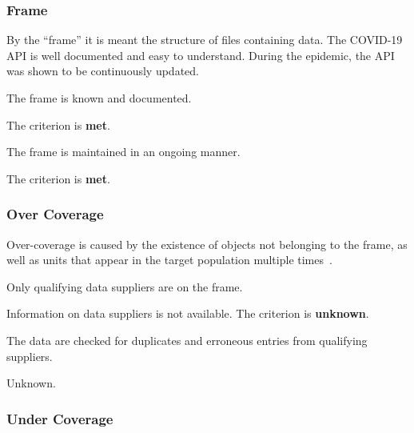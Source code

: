 \subsubsection{Frame}

By the \enquote{frame} it is meant the structure of files containing data.
The COVID-19 API is well documented and easy to understand.
During the epidemic, the API was shown to be continuously updated.

\begin{QandA}
    \item The frame is known and documented.
    \begin{answered}
        The criterion is \textbf{met}.
    \end{answered}

    \item The frame is maintained in an ongoing manner.
    \begin{answered}
        The criterion is \textbf{met}.
    \end{answered}

\end{QandA}

\subsubsection{Over Coverage}

Over-coverage is caused by the existence of objects not belonging to the frame, as well as units that appear in the target population multiple times~\cite{over-coverage}.

\begin{QandA}
    \item Only qualifying data suppliers are on the frame.
    \begin{answered}
        Information on data suppliers is not available.
        The criterion is \textbf{unknown}.
    \end{answered}

    \item The data are checked for duplicates and erroneous entries from qualifying suppliers.
    \begin{answered}
        Unknown.
    \end{answered}

\end{QandA}

\subsubsection{Under Coverage}

